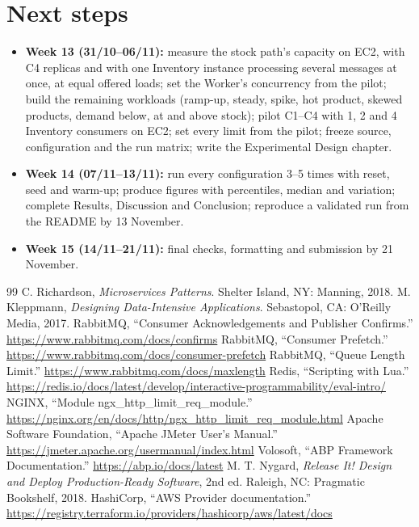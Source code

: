 \documentclass[12pt,a4paper]{article}
\begin{document}
\section{Next steps}
\begin{itemize}
  \item \textbf{Week 13 (31/10--06/11):} measure the stock path's capacity
    on EC2, with C4 replicas and with one Inventory instance processing
    several messages at once, at equal offered loads; set the Worker's concurrency from the pilot; build the remaining workloads (ramp-up, steady, spike, hot product,
    skewed products, demand below, at and above stock); pilot C1--C4 with 1, 2
    and 4 Inventory consumers on EC2; set every limit from the pilot; freeze
    source, configuration and the run matrix; write the Experimental Design
    chapter.
  \item \textbf{Week 14 (07/11--13/11):} run every configuration 3--5 times
    with reset, seed and warm-up; produce figures with percentiles, median and
    variation; complete Results, Discussion and Conclusion; reproduce a
    validated run from the README by 13 November.
  \item \textbf{Week 15 (14/11--21/11):} final checks, formatting and
    submission by 21 November.
\end{itemize}

\begin{singlespace}
\begin{thebibliography}{99}
 C. Richardson, \emph{Microservices Patterns}. Shelter Island, NY: Manning, 2018.
 M. Kleppmann, \emph{Designing Data-Intensive Applications}. Sebastopol, CA: O'Reilly Media, 2017.
 RabbitMQ, ``Consumer Acknowledgements and Publisher Confirms.'' \url{https://www.rabbitmq.com/docs/confirms}
 RabbitMQ, ``Consumer Prefetch.'' \url{https://www.rabbitmq.com/docs/consumer-prefetch}
 RabbitMQ, ``Queue Length Limit.'' \url{https://www.rabbitmq.com/docs/maxlength}
 Redis, ``Scripting with Lua.'' \url{https://redis.io/docs/latest/develop/interactive-programmability/eval-intro/}
 NGINX, ``Module ngx\_http\_limit\_req\_module.'' \url{https://nginx.org/en/docs/http/ngx_http_limit_req_module.html}
 Apache Software Foundation, ``Apache JMeter User's Manual.'' \url{https://jmeter.apache.org/usermanual/index.html}
 Volosoft, ``ABP Framework Documentation.'' \url{https://abp.io/docs/latest}
 M. T. Nygard, \emph{Release It! Design and Deploy Production-Ready Software}, 2nd ed. Raleigh, NC: Pragmatic Bookshelf, 2018.
 HashiCorp, ``AWS Provider documentation.'' \url{https://registry.terraform.io/providers/hashicorp/aws/latest/docs}
\end{thebibliography}
\end{singlespace}
\end{document}

